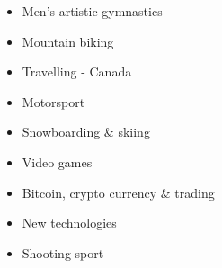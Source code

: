 


\fontsize{9pt}{1em}\bodyfontlight\upshape\color{text}
{
    \begin{multicols}{3}
        \begin{itemize}
            \item Men's artistic gymnastics
            \item Mountain biking
            \item Travelling - Canada
            \item Motorsport
            \item Snowboarding \& skiing
            \item Video games
            \item Bitcoin, crypto currency \& trading
            \item New technologies
            \item Shooting sport
        \end{itemize}
    \end{multicols}
}